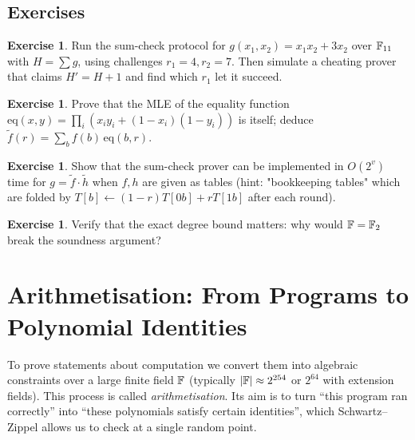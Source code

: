 \documentclass[11pt,a4paper]{report}
\theoremstyle{plain}
\theoremstyle{definition}
\newtheorem{exercise}[theorem]{Exercise}
\theoremstyle{remark}
\begin{document}
\section*{Exercises}
\begin{exercise}\label{ex:sumcheckrun}
Run the sum-check protocol for $g(x_1,x_2)=x_1x_2+3x_2$ over $\mathbb{F}_{11}$ with $H=\sum g$, using challenges $r_1=4,r_2=7$. Then simulate a cheating prover that claims $H'=H+1$ and find which $r_1$ let it succeed.
\end{exercise}
\begin{exercise}
Prove that the MLE of the equality function $\mathrm{eq}(x,y)=\prod_i(x_iy_i+(1-x_i)(1-y_i))$ is itself; deduce $\tilde f(r)=\sum_{b}f(b)\,\mathrm{eq}(b,r)$.
\end{exercise}
\begin{exercise}
Show that the sum-check prover can be implemented in $O(2^v)$ time for $g=\tilde f\cdot\tilde h$ when $f,h$ are given as tables (hint: "bookkeeping tables" which are folded by $T[b]\leftarrow(1-r)T[0b]+rT[1b]$ after each round).
\end{exercise}
\begin{exercise}
Verify that the exact degree bound matters: why would $\mathbb{F}=\mathbb{F}_2$ break the soundness argument?
\end{exercise}

\chapter{Arithmetisation: From Programs to Polynomial Identities}
\label{ch:arith}
To prove statements about computation we convert them into algebraic constraints over a large finite field $\mathbb{F}$ (typically $|\mathbb{F}|\approx2^{254}$ or $2^{64}$ with extension fields). This process is called \emph{arithmetisation}. Its aim is to turn ``this program ran correctly'' into ``these polynomials satisfy certain identities'', which Schwartz--Zippel allows us to check at a single random point.
\begin{center}
\end{center}
\end{document}
